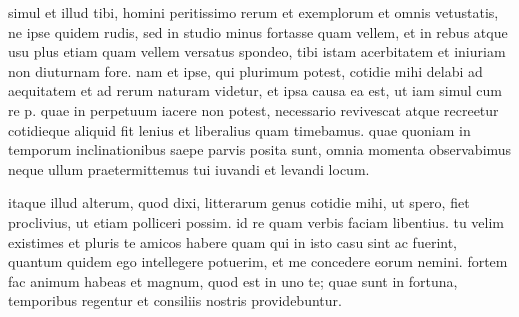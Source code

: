  simul et illud tibi, homini peritissimo rerum et exemplorum et omnis vetustatis, ne ipse quidem rudis, sed in studio minus fortasse quam vellem, et in rebus atque usu plus etiam quam vellem versatus spondeo, tibi istam acerbitatem et iniuriam non diuturnam fore. nam et ipse, qui plurimum potest, cotidie mihi delabi ad aequitatem et ad rerum naturam videtur, et ipsa causa ea est, ut iam simul cum re p. quae in perpetuum iacere non potest, necessario revivescat atque recreetur cotidieque aliquid fit lenius et liberalius quam timebamus. quae quoniam in temporum inclinationibus saepe parvis posita sunt, omnia momenta observabimus neque ullum praetermittemus tui iuvandi et levandi locum.

 itaque illud alterum, quod dixi, litterarum genus cotidie mihi, ut spero, fiet proclivius, ut etiam polliceri possim. id re quam verbis faciam libentius. tu velim existimes et pluris te amicos habere quam qui in isto casu sint ac fuerint, quantum quidem ego intellegere potuerim, et me concedere eorum nemini. fortem fac animum habeas et magnum, quod est in uno te; quae sunt in fortuna, temporibus regentur et consiliis nostris providebuntur.
